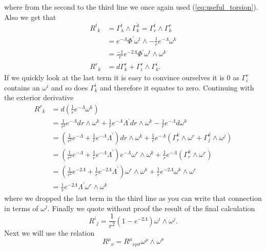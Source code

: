 \documentclass[12pt]{article}
\numberwithin{equation}{section}
\numberwithin{figure}{section}
\begin{document}
where from the second to the third line we once again used (\ref{eq:useful_torsion}). Also we get that
\begin{align}
{R^{t}}_{k} &= \Gamma^{t}_{\lambda}\wedge \Gamma^{\lambda}_{k} = \Gamma^{t}_{r}\wedge \Gamma^{r}_{k}\\
			&= e^{-\Lambda}\Phi ^{\prime}  \omega^{t} \wedge -\frac{1}{r}e^{-\Lambda}\omega^{k}\\
			&= \frac{-1}{r}e^{-2\Lambda} \Phi ^{\prime} \omega^{t} \wedge \omega^{k}\\
{R^{r}}_{k} &=d \Gamma^{r}_{k}+\Gamma^{r}_{i}\wedge \Gamma^{i}_{k}.
\end{align}
If we quickly look at the last term it is easy to convince ourselves it is $0$ as $\Gamma^{r}_{i}$ contains an $\omega^{i}$ and so does $\Gamma^{i}_{k}$ and therefore it equates to zero. Continuing with the exterior derivative
\begin{align}
{R^{r}}_{k} &=d\left(\frac{1}{r}e^{-\Lambda}\omega^{k}\right)\\
			&= \frac{1}{r^{2}}e^{-\Lambda} dr\wedge \omega^{k}	+ \frac{1}{r}e^{-\Lambda}\Lambda ^{\prime} dr \wedge \omega^{k}	- \frac{1}{r}e^{-\Lambda} d\omega^{k}\\
			&=\left(\frac{1}{r^{2}}e^{-\Lambda} +\frac{1}{r}e^{-\Lambda}\Lambda ^{\prime} \right) dr \wedge \omega^{k} +\frac{1}{r}e^{-\Lambda}\left(\Gamma^{k}_{r} \wedge \omega^{r} + \Gamma^{k}_{j} \wedge \omega^{j}\right)\\
			&=\left(\frac{1}{r^{2}}e^{-\Lambda} +\frac{1}{r}e^{-\Lambda}\Lambda ^{\prime} \right)e^{-\Lambda}\omega^{r} \wedge \omega^{k} +\frac{1}{r}e^{-\Lambda}\left(\Gamma^{k}_{r} \wedge \omega^{r}\right)\\
			&=\left(\frac{1}{r^{2}}e^{-2\Lambda} +\frac{1}{r}e^{-2\Lambda}\Lambda ^{\prime} \right)\omega^{r} \wedge \omega^{k} +\frac{1}{r}e^{-2\Lambda}\omega^{k} \wedge \omega^{r}\\
			&= \frac{1}{r}e^{-2\Lambda} \Lambda ^{\prime} \omega^{r}\wedge \omega^{k}
\end{align}
where we dropped the last term in the third line as you can write that connection in terms of $\omega^{j}$. Finally we quote\cite{extra_dimension_thesis} without proof the result of the final calculation
\begin{equation}
	{R^{i}}_{j} = \frac{1}{r^{2}}(1-e^{-2\Lambda})\omega^{i}\wedge \omega^{j}.
\end{equation}
Next we will use the relation 
\begin{equation}
	{R^{\mu}}_{\nu} = {R^{\mu}}_{\nu\rho\sigma}\omega^{\rho}\wedge\omega^{\sigma}
\end{equation}
\end{document}
